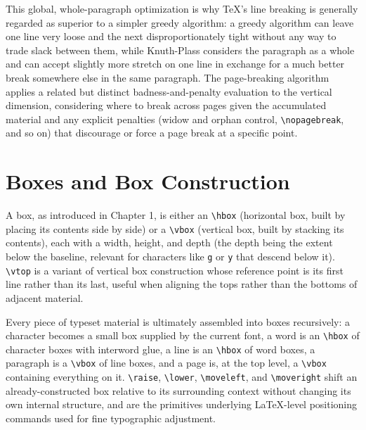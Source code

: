 This global, whole-paragraph optimization is why TeX's line breaking is generally regarded as superior to a simpler greedy algorithm: a greedy algorithm can leave one line very loose and the next disproportionately tight without any way to trade slack between them, while Knuth-Plass considers the paragraph as a whole and can accept slightly more stretch on one line in exchange for a much better break somewhere else in the same paragraph. The page-breaking algorithm applies a related but distinct badness-and-penalty evaluation to the vertical dimension, considering where to break across pages given the accumulated material and any explicit penalties (widow and orphan control, \texttt{\textbackslash{}nopagebreak}, and so on) that discourage or force a page break at a specific point.

\hypertarget{a.8-boxes-and-box-construction}{%
\section{Boxes and Box Construction}\label{a.8-boxes-and-box-construction}}

A box, as introduced in Chapter 1, is either an \texttt{\textbackslash{}hbox} (horizontal box, built by placing its contents side by side) or a \texttt{\textbackslash{}vbox} (vertical box, built by stacking its contents), each with a width, height, and depth (the depth being the extent below the baseline, relevant for characters like \texttt{g} or \texttt{y} that descend below it). \texttt{\textbackslash{}vtop} is a variant of vertical box construction whose reference point is its first line rather than its last, useful when aligning the tops rather than the bottoms of adjacent material.

Every piece of typeset material is ultimately assembled into boxes recursively: a character becomes a small box supplied by the current font, a word is an \texttt{\textbackslash{}hbox} of character boxes with interword glue, a line is an \texttt{\textbackslash{}hbox} of word boxes, a paragraph is a \texttt{\textbackslash{}vbox} of line boxes, and a page is, at the top level, a \texttt{\textbackslash{}vbox} containing everything on it. \texttt{\textbackslash{}raise}, \texttt{\textbackslash{}lower}, \texttt{\textbackslash{}moveleft}, and \texttt{\textbackslash{}moveright} shift an already-constructed box relative to its surrounding context without changing its own internal structure, and are the primitives underlying LaTeX-level positioning commands used for fine typographic adjustment.


